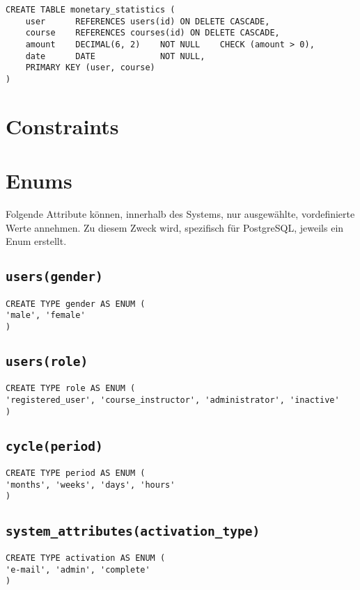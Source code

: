 \begin{verbatim}
CREATE TABLE monetary_statistics (
    user      REFERENCES users(id) ON DELETE CASCADE,
    course    REFERENCES courses(id) ON DELETE CASCADE,
    amount    DECIMAL(6, 2)    NOT NULL    CHECK (amount > 0),
    date      DATE             NOT NULL,
    PRIMARY KEY (user, course)
)
\end{verbatim}

\section{Constraints}


\section{Enums}
Folgende Attribute können, innerhalb des Systems, nur ausgewählte, vordefinierte Werte annehmen. Zu diesem Zweck wird, spezifisch für PostgreSQL, jeweils ein Enum erstellt.

\subsection{\texttt{users(gender)}}

\begin{verbatim}
CREATE TYPE gender AS ENUM (
'male', 'female'
)
\end{verbatim}

\subsection{\texttt{users(role)}}

\begin{verbatim}
CREATE TYPE role AS ENUM (
'registered_user', 'course_instructor', 'administrator', 'inactive'
)
\end{verbatim}

\subsection{\texttt{cycle(period)}}

\begin{verbatim}
CREATE TYPE period AS ENUM (
'months', 'weeks', 'days', 'hours'
)
\end{verbatim}

\subsection{\texttt{system\_attributes(activation\_type)}}

\begin{verbatim}
CREATE TYPE activation AS ENUM (
'e-mail', 'admin', 'complete'
)
\end{verbatim}
